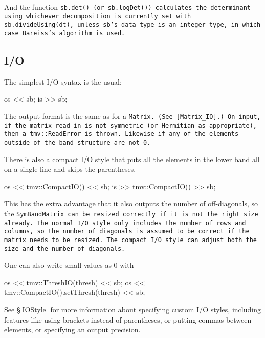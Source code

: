 And the function \tt{sb.det()} (or \tt{sb.logDet()}) calculates the determinant
using whichever decomposition is currently set with \tt{sb.divideUsing(dt)},
unless \tt{sb}'s data type is an integer type, in which case Bareiss's algorithm 
is used.

\subsection{I/O}
\label{SymBandMatrix_IO}

The simplest I/O syntax is the usual:
\begin{tmvcode}
os << sb;
is >> sb;
\end{tmvcode}
The output format is the same as for a \tt{Matrix}.
(See \ref{Matrix_IO}.)  On input, if the matrix read in is not symmetric (or Hermitian as appropriate), then a \tt{tmv::ReadError} is thrown.  Likewise if any of the elements outside of the band structure
are not 0.

There is also a compact I/O style that puts all the elements in the lower band all on a single line and skips the parentheses. 
\begin{tmvcode}
os << tmv::CompactIO() << sb;
is >> tmv::CompactIO() >> sb;
\end{tmvcode}
This has the extra advantage that it also outputs the number of off-diagonals, so the \tt{SymBandMatrix} can be resized correctly if it is not the right size already.  The normal I/O style only includes the number of rows and columns, so the number of diagonals is assumed to be correct if the matrix needs to be resized.  The compact I/O style can adjust both the size and the number of diagonals.

One can also write small values as 0 with
\begin{tmvcode}
os << tmv::ThreshIO(thresh) << sb;
os << tmv::CompactIO().setThresh(thresh) << sb;
\end{tmvcode}

See \S\ref{IOStyle} for more information about specifying custom I/O styles, including
features like using brackets instead of parentheses, or putting commas between elements,
or specifying an output precision.  

